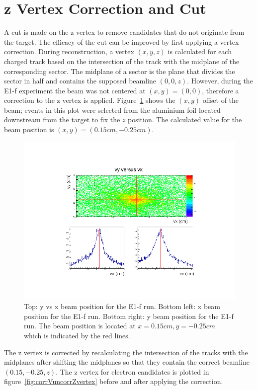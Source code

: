 \section{z Vertex Correction and Cut}
\label{sec:zvertexCorrAndCut}
%
A cut is made on the z vertex to remove candidates that do not originate from the target.
The efficacy of the cut can be improved by first applying a vertex correction.
During reconstruction, a vertex $(x, y, z)$ is calculated for each charged track based on the intersection of the track with the midplane of the corresponding sector.
The midplane of a sector is the plane that divides the sector in half and contains the supposed beamline $(0, 0, z)$.
However, during the E1-f experiment the beam was not centered at $(x, y) = (0, 0)$, therefore a correction to the z vertex is applied.
Figure~\ref{fig:xyBeamOffset} shows the $(x, y)$ offset of the beam; events in this plot were selected from the aluminium foil located downstream from the target to fix the $z$ position.
The calculated value for the beam position is $(x, y) = (0.15 cm, -0.25 cm)$.

\begin{figure}[htp]
\centering
\includegraphics[width=6in, trim={1cm 1cm 1cm 1cm}, clip]{figures/xyBeamOffset.png}
\caption{Top: y vs x beam position for the E1-f run. Bottom left: x beam position for the E1-f run. Bottom right: y beam position for the E1-f run. The beam position is located at $x = 0.15 cm, y = -0.25 cm$ which is indicated by the red lines.}
\label{fig:xyBeamOffset}
\end{figure}
%
The z vertex is corrected by recalculating the intersection of the tracks with the midplanes after shifting the midplanes so that they contain the correct beamline $(0.15, -0.25, z)$.
The z vertex for electron candidates is plotted in figure~\ref{fig:corrVuncorrZvertex} before and after applying the correction.

